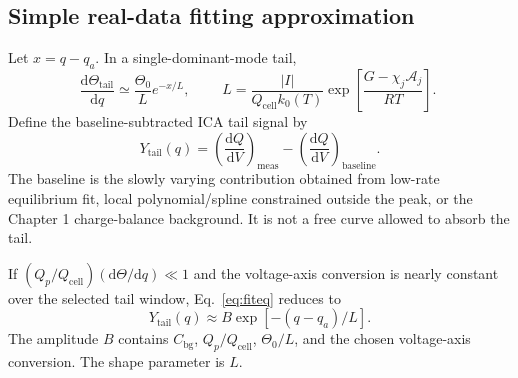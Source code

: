 \documentclass[11pt,a4paper]{article}
\newcommand{\dd}{\mathrm{d}}
\newcommand{\bg}{\mathrm{bg}}
\newcommand{\cell}{\mathrm{cell}}
\newcommand{\tail}{\mathrm{tail}}
\begin{document}
\subsection{Simple real-data fitting approximation}\label{sec:ch1_simplefit}
Let $x=q-q_a$. In a single-dominant-mode tail,
\begin{equation}
\frac{\dd\Theta_{\tail}}{\dd q}\simeq\frac{\Theta_0}{L}e^{-x/L},
\qquad
\boxed{\;L=\frac{|I|}{Q_{\cell}k_0(T)}
\exp\left[\frac{G-\chi_j\mathcal A_j}{RT}\right].\;}
\label{eq:simplefit}
\end{equation}
Define the baseline-subtracted ICA tail signal by
\begin{equation}
Y_{\tail}(q)=\left(\frac{\dd Q}{\dd V}\right)_{\mathrm{meas}}
-\left(\frac{\dd Q}{\dd V}\right)_{\mathrm{baseline}}.
\label{eq:Ytail_def}
\end{equation}
The baseline is the slowly varying contribution obtained from low-rate equilibrium fit, local polynomial/spline constrained outside the peak,
or the Chapter 1 charge-balance background. It is not a free curve allowed to absorb the tail.

If $(Q_p/Q_{\cell})(\dd\Theta/\dd q)\ll1$ and the voltage-axis conversion is nearly constant over the selected tail window, Eq.~\eqref{eq:fiteq}
reduces to
\begin{equation}
\boxed{\;Y_{\tail}(q)\approx B\exp[-(q-q_a)/L].\;}
\label{eq:Ytail_simple}
\end{equation}
The amplitude $B$ contains $C_{\bg}$, $Q_p/Q_{\cell}$, $\Theta_0/L$, and the chosen voltage-axis conversion. The shape parameter is $L$.
\end{document}
